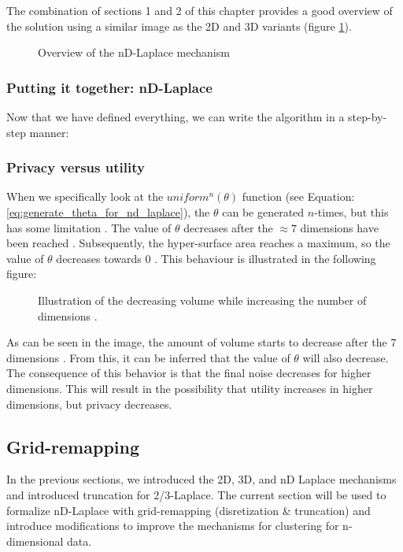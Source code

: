 The combination of sections 1 and 2 of this chapter provides a good overview of the solution using a similar image as the 2D and 3D variants (figure \ref{fig:nd-laplace-overview}).
\begin{figure}[H]
   \centering
  
  \caption{Overview of the nD-Laplace mechanism}
  \label{fig:nd-laplace-overview}
\end{figure}
\newpage

\subsubsection{Putting it together: nD-Laplace}
Now that we have defined everything, we can write the algorithm in a step-by-step manner:

\subsubsection{Privacy versus utility} \label{theory:privacy-utility-nd}
When we specifically look at the \(uniform^n(\theta)\) function (see Equation: \ref{eq:generate_theta_for_nd_laplace}), the \(\theta\) can be generated \(n\)-times, but this has some limitation \citep{weisstein_hypersphere_nodate}.
The value of \(\theta\) decreases after the $\approx 7$ dimensions have been reached \citep{wells_penguin_1997}. Subsequently, the hyper-surface area reaches a maximum, so the value of $\theta$ decreases towards 0 \citep{weisstein_hypersphere_nodate}.
This behaviour is illustrated in the following figure:
\begin{figure}[H]
\centering
  
  \caption{Illustration of the decreasing volume while increasing the number of dimensions \citep{weisstein_hypersphere_nodate}.}
  \label{fig:curse-of-dimensionality}
\end{figure}
As can be seen in the image, the amount of volume starts to decrease after the 7 dimensions . From this, it can be inferred that the value of  $\theta$ will also decrease. 
The consequence of this behavior is that the final noise decreases for higher dimensions. This will result in the possibility that utility increases in higher dimensions, but privacy decreases.

\newpage
\subsection{Grid-remapping \label{section-grid-remapping}}
In the previous sections, we introduced the 2D, 3D, and nD Laplace mechanisms and introduced truncation for 2/3-Laplace.
The current section will be used to formalize nD-Laplace with grid-remapping (disretization \& truncation) and introduce modifications to improve the mechanisms for clustering for n-dimensional data.

